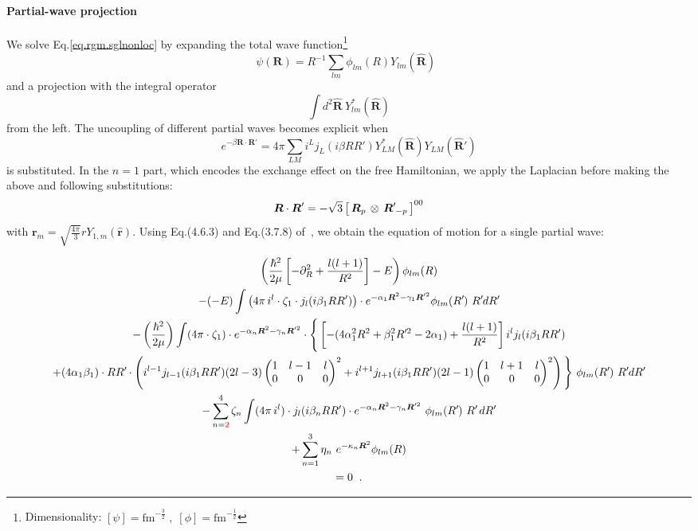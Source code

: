 \documentclass
[aps,nofootinbib,prl,showpacs,twocolumn,groupedaddress,superscriptaddress]
{revtex4}
\newcommand*{\mprime}{^{\prime}\mkern-1.2mu}
\newcommand{\red}[1]{\textcolor{red}{#1}}
\newcommand{\la}{\label}
\newcommand{\be}{\begin{equation}}
\newcommand{\ee}{\end{equation}}
\newcommand{\ve}[1]{\ensuremath{\boldsymbol{#1}}}
\newcommand{\coup}[3]{\left[\,#1\,\otimes\,#2\,\right]^{#3}}
\newcommand{\threej}[6]{ \begin{pmatrix}
   #1 & #2 & #3 \\
   #4 & #5 & #6 
  \end{pmatrix}}
\begin{document}
\paragraph{Partial-wave projection} We solve Eq.\eqref{eq.rgm.sglnonloc} by expanding
the total wave function\footnote{Dimensionality: $[\psi]=\text{fm}^{-\frac{3}{2}}\;,\;[\phi]=\text{fm}^{-\frac{1}{2}}$}
\be
\psi(\ve{R})=R^{-1}\sum_{lm}\phi_{lm}(R)Y_{lm}(\hat{\ve{R}})\;\;
\ee
and a projection with the integral operator
\be
\int d^2\hat{\ve{R}}~Y^*_{lm}(\hat{\ve{R}})
\ee
from the left. The uncoupling of different partial waves becomes explicit when
\be
e^{-\beta\ve{R}\cdot\ve{R}'}=4\pi\sum_{LM}i^Lj_L(i\beta RR')Y^*_{LM}(\hat{\ve{R}})Y_{LM}(\hat{\ve{R}}')
\ee
is substituted. In the $n=1$ part, which encodes the exchange effect on the free
Hamiltonian, we apply the Laplacian before making the above and following
substitutions:
\be
\ve{R}\cdot\ve{R}'=-\sqrt{3}\coup{\ve{R}_p}{\ve{R}\mprime_{-p}}{00}
\ee
with $\ve{r}_m=\sqrt{\frac{4\pi}{3}}rY_{1,m}(\hat{\ve{r}})$. Using Eq.(4.6.3) and
Eq.(3.7.8) of~\cite{Edmonds}, we obtain the equation of motion for a single
partial wave:
\begin{widetext}
\begin{subequations}\la{eq.rgm.sglnonloc.pw}
\begin{gather}
\left(\frac{\hbar^2}{2\mu}\left[-\partial^2_R+\frac{l(l+1)}{R^2}\right]-E\right)
\phi_{lm}(R)\\
-(-E)\int
\left(4\pi\,i^l\cdot\zeta_1\cdot j_l(i\beta_1 RR')\right)\cdot
 e^{-\alpha_1\ve{R}^2-\gamma_1\ve{R}'^2}\phi_{lm}(R\mprime)~R\mprime dR\mprime
 \la{eq.rgm.sglnonloc.pw.Eex}\\
-\left(\frac{\hbar^2}{2\mu}\right)\int
(4\pi\cdot\zeta_1) \cdot e^{-\alpha_n\ve{R}^2-\gamma_n\ve{R}'^2}
\cdot\Bigg\lbrace
\left[-(4\alpha_1^2R^2+\beta_1^2R\mprime^2-2\alpha_1)+\frac{l(l+1)}{R^2}\right]
 i^l j_{l}(i\beta_1 RR')\nonumber\\
+(4\alpha_1\beta_1)\cdot RR\mprime\cdot
 \left(i^{l-1} j_{l-1}(i\beta_1 RR') (2l-3)
 \threej{1}{l-1}{l}{0}{0}{0}^2+
 i^{l+1} j_{l+1}(i\beta_1 RR') (2l-1)
 \threej{1}{l+1}{l}{0}{0}{0}^2\right)\Bigg\rbrace
~\phi_{lm}(R\mprime)~R\mprime dR\mprime\la{eq.rgm.sglnonloc.pw.tex}\\
-\sum_{n=\red{2}}^4\zeta_n\int
(4\pi\,i^l)\cdot j_l(i\beta_n RR')\cdot 
e^{-\alpha_n\ve{R}^2-\gamma_n\ve{R}'^2}~\phi_{lm}(R\mprime)~R\mprime\,dR\mprime\la{eq.rgm.sglnonloc.pw.noloc}\\
+\sum_{n=1}^3\eta_n~e^{-\kappa_n\ve{R}^2}\phi_{lm}(R)\la{eq.rgm.sglnonloc.pw.t}\\
 =0\;\;.\nonumber
\end{gather}
\end{subequations}
\end{widetext}
\end{document}
